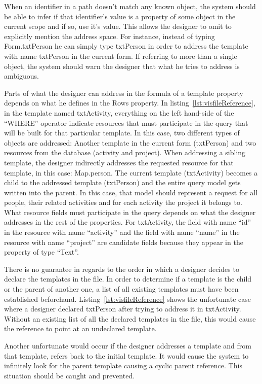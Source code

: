 When an identifier in a path doesn't match any known object, the system should be able to infer if that identifier's value is a property of some object in the current scope and if so, use it's value. This allows the designer to omit to explicitly mention the address space. For instance, instead of typing Form.txtPerson he can simply type txtPerson in order to address the template with name txtPerson in the current form. If referring to more than a single object, the system should warn the designer that what he tries to address is ambiguous.

Parts of what the designer can address in the formula of a template property depends on what he defines in the Rows property. In listing~\ref{lst:visfileReference}, in the template named txtActivity, everything on the left hand-side of the ``WHERE'' operator indicate resources that must participate in the query that will be built for that particular template. In this case, two different types of objects are addressed: Another template in the current form (txtPerson) and two resources from the database (activity and project). When addressing a sibling template, the designer indirectly addresses the requested resource for that template, in this case: Map.person. The current template (txtActivity) becomes a child to the addressed template (txtPerson) and the entire query model gets written into the parent. In this case, that model should represent a request for all people, their related activities and for each activity the project it belongs to. What resource fields must participate in the query depends on what the designer addresses in the rest of the properties. For txtActivity, the field with name ``id'' in the resource with name ``activity'' and the field with name ``name'' in the resource with name ``project'' are candidate fields because they appear in the property of type ``Text''.

There is no guarantee in regards to the order in which a designer decides to declare the templates in the file. In order to determine if a template is the child or the parent of another one, a list of all existing templates must have been established beforehand. Listing~\ref{lst:visfileReference} shows the unfortunate case where a designer declared txtPerson after trying to address it in txtActivity. Without an existing list of all the declared templates in the file, this would cause the reference to point at an undeclared template.

Another unfortunate would occur if the designer addresses a template and from that template, refers back to the initial template. It would cause the system to infinitely look for the parent template causing a cyclic parent reference. This situation should be caught and prevented.

